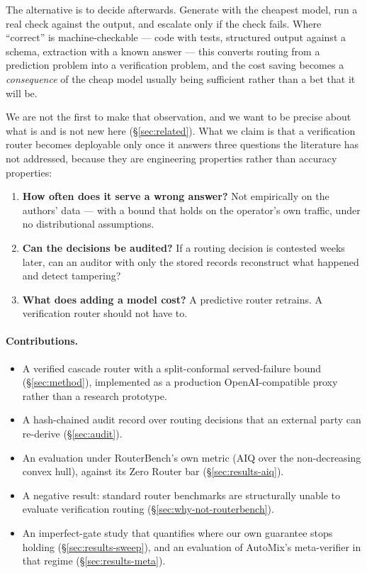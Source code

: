 \documentclass[11pt]{article}
\begin{document}
The alternative is to decide afterwards. Generate with the cheapest model, run a real check against
the output, and escalate only if the check fails. Where ``correct'' is machine-checkable --- code
with tests, structured output against a schema, extraction with a known answer --- this converts
routing from a prediction problem into a verification problem, and the cost saving becomes a
\emph{consequence} of the cheap model usually being sufficient rather than a bet that it will be.

We are not the first to make that observation, and we want to be precise about what is and is not
new here (\S\ref{sec:related}). What we claim is that a verification router becomes deployable only
once it answers three questions the literature has not addressed, because they are engineering
properties rather than accuracy properties:

\begin{enumerate}
  \item \textbf{How often does it serve a wrong answer?} Not empirically on the authors' data ---
  with a bound that holds on the operator's own traffic, under no distributional assumptions.
  \item \textbf{Can the decisions be audited?} If a routing decision is contested weeks later, can
  an auditor with only the stored records reconstruct what happened and detect tampering?
  \item \textbf{What does adding a model cost?} A predictive router retrains. A verification router
  should not have to.
\end{enumerate}

\paragraph{Contributions.}
\begin{itemize}
  \item A verified cascade router with a split-conformal served-failure bound
  (\S\ref{sec:method}), implemented as a production OpenAI-compatible proxy rather than a research
  prototype.
  \item A hash-chained audit record over routing decisions that an external party can re-derive
  (\S\ref{sec:audit}).
  \item An evaluation under RouterBench's own metric (AIQ over the non-decreasing convex hull),
  against its Zero Router bar (\S\ref{sec:results-aiq}).
  \item A negative result: standard router benchmarks are structurally unable to evaluate
  verification routing (\S\ref{sec:why-not-routerbench}).
  \item An imperfect-gate study that quantifies where our own guarantee stops holding
  (\S\ref{sec:results-sweep}), and an evaluation of AutoMix's meta-verifier in that regime
  (\S\ref{sec:results-meta}).
\end{itemize}
\end{document}
